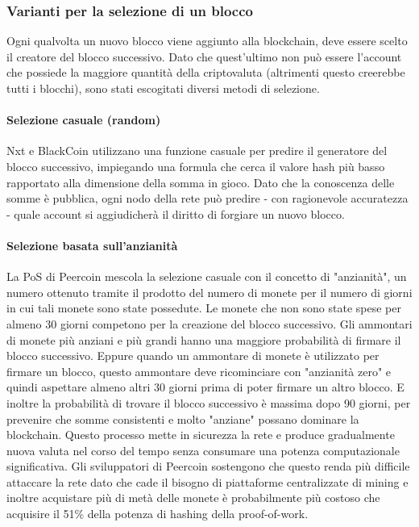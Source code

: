 \subsubsection{Varianti per la selezione di un blocco}
Ogni qualvolta un nuovo blocco viene aggiunto alla blockchain, deve essere scelto il creatore del blocco successivo. Dato che quest'ultimo non può essere l'account che possiede la maggiore quantità della criptovaluta (altrimenti questo creerebbe tutti i blocchi), sono stati escogitati diversi metodi di selezione.


\paragraph{Selezione casuale (random)}
Nxt e BlackCoin utilizzano una funzione casuale per predire il generatore del blocco successivo, impiegando una formula che cerca il valore hash più basso rapportato alla dimensione della somma in gioco. Dato che la conoscenza delle somme è pubblica, ogni nodo della rete può predire - con ragionevole accuratezza - quale account si aggiudicherà il diritto di forgiare un nuovo blocco.

\paragraph{Selezione basata sull'anzianità}
La PoS di Peercoin mescola la selezione casuale con il concetto di "anzianità", un numero ottenuto tramite il prodotto del numero di monete per il numero di giorni in cui tali monete sono state possedute. Le monete che non sono state spese per almeno 30 giorni competono per la creazione del blocco successivo. Gli ammontari di monete più anziani e più grandi hanno una maggiore probabilità di firmare il blocco successivo. Eppure quando un ammontare di monete è utilizzato per firmare un blocco, questo ammontare deve ricominciare con "anzianità zero" e quindi aspettare almeno altri 30 giorni prima di poter firmare un altro blocco. E inoltre la probabilità di trovare il blocco successivo è massima dopo 90 giorni, per prevenire che somme consistenti e molto "anziane" possano dominare la blockchain. Questo processo mette in sicurezza la rete e produce gradualmente nuova valuta nel corso del tempo senza consumare una potenza computazionale significativa. Gli sviluppatori di Peercoin sostengono che questo renda più difficile attaccare la rete dato che cade il bisogno di piattaforme centralizzate di mining e inoltre acquistare più di metà delle monete è probabilmente più costoso che acquisire il 51\% della potenza di hashing della proof-of-work.

